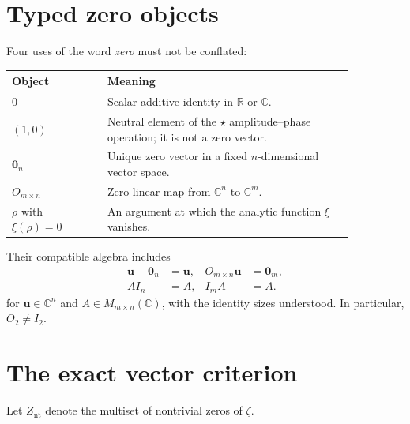 \documentclass[11pt]{article}
\newcommand{\Znt}{Z_{\mathrm{nt}}}
\newcommand{\vzero}{\mathbf 0}
\begin{document}
\section{Typed zero objects}
Four uses of the word \emph{zero} must not be conflated:
\begin{center}
\begin{tabular}{p{0.24\linewidth}p{0.62\linewidth}}
\toprule
Object & Meaning\\
\midrule
$0$ & Scalar additive identity in $\mathbb R$ or $\mathbb C$.\\
$(1,0)$ & Neutral element of the $\star$ amplitude--phase operation; it is not a zero vector.\\
$\vzero_n$ & Unique zero vector in a fixed $n$-dimensional vector space.\\
$O_{m\times n}$ & Zero linear map from $\mathbb C^n$ to $\mathbb C^m$.\\
$\rho$ with $\xi(\rho)=0$ & An argument at which the analytic function $\xi$ vanishes.\\
\bottomrule
\end{tabular}
\end{center}
Their compatible algebra includes
\begin{align}\label{eq:zero-identities}
 \mathbf u+\vzero_n&=\mathbf u,&
 O_{m\times n}\mathbf u&=\vzero_m,\\
 AI_n&=A,& I_mA&=A.
\end{align}
for $\mathbf u\in\mathbb C^n$ and $A\in M_{m\times n}(\mathbb C)$, with the identity sizes
understood.  In particular, $O_2\ne I_2$.

\section{The exact vector criterion}
Let $\Znt$ denote the multiset of nontrivial zeros of $\zeta$.
\end{document}
